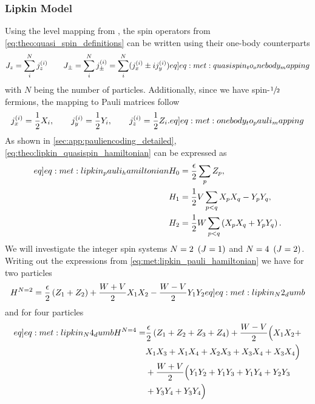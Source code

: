 \subsubsection{Lipkin Model}
Using the level mapping from \citep{hlatshwayoSimulatingExcitedStates2022}, the spin operators from \cref{eq:theo:quasi_spin_definitions} can be written using their one-body counterparts 
\begin{align}
    J_z = \sum_{i}^{N} \spinsmall{z}{i} \hspace{20px} J_\pm = \sum_i^N \spinsmall{\pm}{i} = \sum_i^N (\spinsmall{x}{i}\pm i\spinsmall{y}{i}) \label[eq]{eq:met:quasispin_to_onebody_mapping}
\end{align}
with $N$ being the number of particles. Additionally, since we have spin-$\sfrac{1}{2}$ fermions, the mapping to Pauli matrices follow
\begin{align}
    \spinsmall{x}{i} = \frac{1}{2}X_i,\hspace{20px}\spinsmall{y}{i} = \frac{1}{2}Y_i,\hspace{20px}\spinsmall{z}{i} = \frac{1}{2}Z_i. \label[eq]{eq:met:onebody_to_pauli_mapping}
\end{align}
As shown in \cref{sec:app:pauliencoding_detailed}, \cref{eq:theo:lipkin_quasispin_hamiltonian} can be expressed as
\begin{align}
    \begin{split}\label[eq]{eq:met:lipkin_pauli_hamiltonian} 
        H_0 &= \frac{\epsilon}{2}\sum_{p}Z_p,  \\
        H_1 &= \frac{1}{2}V \sum_{p < q} X_p X_q - Y_p Y_q, \\
        H_2 &= \frac{1}{2}W \sum_{p < q} \pclosed{ X_p X_q + Y_p Y_q }. 
    \end{split}
\end{align}
We will investigate the integer spin systems $N=2\hspace{5px}(J=1)$ and $N=4\hspace{5px}(J=2)$. Writing out the expressions from \cref{eq:met:lipkin_pauli_hamiltonian} we have for two particles
\begin{align}
    H^{N=2} = \frac{\epsilon}{2}\pclosed{Z_1 + Z_2} + \frac{W+V}{2} X_1 X_2 - \frac{W-V}{2} Y_1 Y_2 \label[eq]{eq:met:lipkin_N2_dumb}
\end{align}
and for four particles
\begin{align}
    \begin{split} \label[eq]{eq:met:lipkin_N4_dumb}
        H^{N=4} =& \frac{\epsilon}{2}\pclosed{Z_1 + Z_2 + Z_3 + Z_4} + \frac{W-V}{2}\Big( X_1 X_2 +\\ 
        & X_1 X_3 + X_1 X_4 + X_2 X_3 + X_3 X_4 + X_3 X_4
        \Big) \\
        &+ \frac{W+V}{2}\Big( Y_1 Y_2 + Y_1 Y_3 + Y_1 Y_4 + Y_2 Y_3 \\
        & + Y_3 Y_4 + Y_3 Y_4\Big)
    \end{split}
\end{align}
